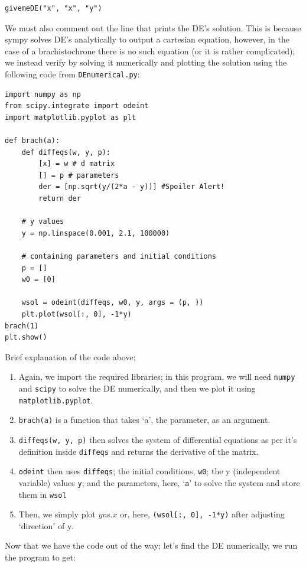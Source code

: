 \documentclass[hidelinks, 11pt]{article}
\begin{document}
\begin{lstlisting}
givemeDE("x", "x", "y")
\end{lstlisting}

\noindent We must also comment out the line that prints the DE's solution. This is because sympy solves DE's analytically to output a cartesian equation, however, in the case of a brachistochrone there is no such equation (or it is rather complicated); we instead verify by solving it numerically and plotting the solution using the following code from \verb|DEnumerical.py|:

\begin{lstlisting}[frame = left]
import numpy as np
from scipy.integrate import odeint
import matplotlib.pyplot as plt

def brach(a):
    def diffeqs(w, y, p):
        [x] = w # d matrix
        [] = p # parameters
        der = [np.sqrt(y/(2*a - y))] #Spoiler Alert!
        return der

    # y values
    y = np.linspace(0.001, 2.1, 100000)

    # containing parameters and initial conditions
    p = []
    w0 = [0]

    wsol = odeint(diffeqs, w0, y, args = (p, ))
    plt.plot(wsol[:, 0], -1*y)
brach(1)
plt.show()
\end{lstlisting}

\noindent Brief explanation of the code above:
\begin{enumerate}
\item Again, we import the required libraries; in this program, we will need \verb|numpy| and \verb|scipy| to solve the DE numerically, and then we plot it using \verb|matplotlib.pyplot|.
\item \verb|brach(a)| is a function that takes `a', the parameter, as an argument.
\item \verb|diffeqs(w, y, p)| then solves the system of differential equations as per it's definition inside \verb|diffeqs| and returns the derivative of the matrix.
\item \verb|odeint| then uses \verb|diffeqs|; the initial conditions, \verb|w0|; the y (independent variable) values \verb|y|; and the parameters, here, `\verb|a|' to solve the system and store them in \verb|wsol|
\item Then, we simply plot $y vs. x$ or, here, \verb|(wsol[:, 0], -1*y)| after adjusting `direction' of y.
\end{enumerate}

\noindent Now that we have the code out of the way; let's find the DE numerically, we run the program to get:
\end{document}
